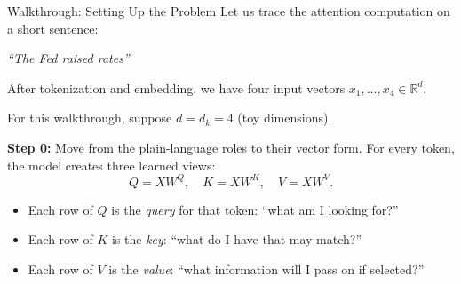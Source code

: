 \documentclass[aspectratio=169]{beamer}
\begin{document}
\begin{frame}{Walkthrough: Setting Up the Problem}
\small
  Let us trace the attention computation on a short sentence:
  \begin{center}
    \textit{``The Fed raised rates''}
  \end{center}
  After tokenization and embedding, we have four input vectors
  $x_1, \ldots, x_4 \in \mathbb{R}^d$.

  For this walkthrough, suppose $d = d_k = 4$ (toy dimensions).

  \vspace{0.5em}
  \textbf{Step 0:} Move from the plain-language roles to their vector form.  For every
  token, the model creates three learned views:
  \[
    Q = XW^Q, \quad K = XW^K, \quad V = XW^V.
  \]
  \begin{itemize}
    \item Each row of $Q$ is the \emph{query} for that token: ``what am I looking for?''
    \item Each row of $K$ is the \emph{key}: ``what do I have that may match?''
    \item Each row of $V$ is the \emph{value}: ``what information will I pass on if
          selected?''
  \end{itemize}
\end{frame}
%
%
\end{document}
